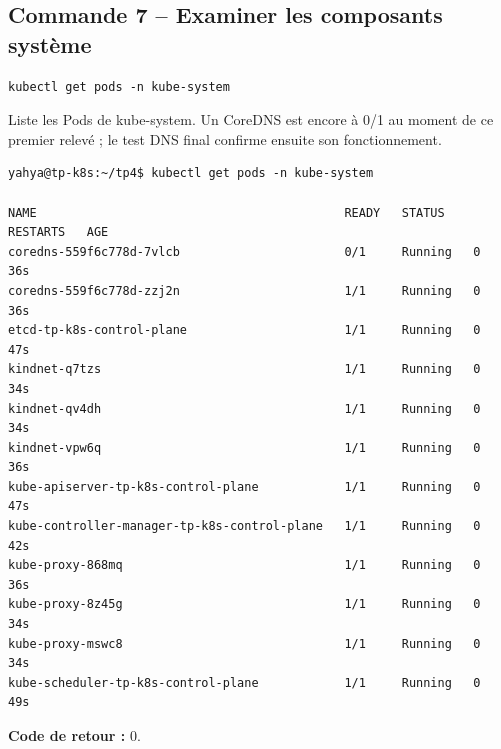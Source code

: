 \documentclass[11pt,a4paper]{article}
\begin{document}
\subsection{Commande 7 -- Examiner les composants système}
\begin{lstlisting}
kubectl get pods -n kube-system
\end{lstlisting}
Liste les Pods de kube-system. Un CoreDNS est encore à 0/1 au moment de ce premier relevé ; le test DNS final confirme ensuite son fonctionnement.
\begin{tcolorbox}[terminal,title={Ubuntu / WSL2 -- Commande 7 -- rendu reconstitué}]
\begin{Verbatim}[fontsize=\scriptsize,breaklines=true,breakanywhere=true,breaksymbolleft={},breaksymbolright={}]
yahya@tp-k8s:~/tp4$ kubectl get pods -n kube-system

NAME                                           READY   STATUS    RESTARTS   AGE
coredns-559f6c778d-7vlcb                       0/1     Running   0          36s
coredns-559f6c778d-zzj2n                       1/1     Running   0          36s
etcd-tp-k8s-control-plane                      1/1     Running   0          47s
kindnet-q7tzs                                  1/1     Running   0          34s
kindnet-qv4dh                                  1/1     Running   0          34s
kindnet-vpw6q                                  1/1     Running   0          36s
kube-apiserver-tp-k8s-control-plane            1/1     Running   0          47s
kube-controller-manager-tp-k8s-control-plane   1/1     Running   0          42s
kube-proxy-868mq                               1/1     Running   0          36s
kube-proxy-8z45g                               1/1     Running   0          34s
kube-proxy-mswc8                               1/1     Running   0          34s
kube-scheduler-tp-k8s-control-plane            1/1     Running   0          49s
\end{Verbatim}
\end{tcolorbox}
\textbf{Code de retour :} 0.
\end{document}
